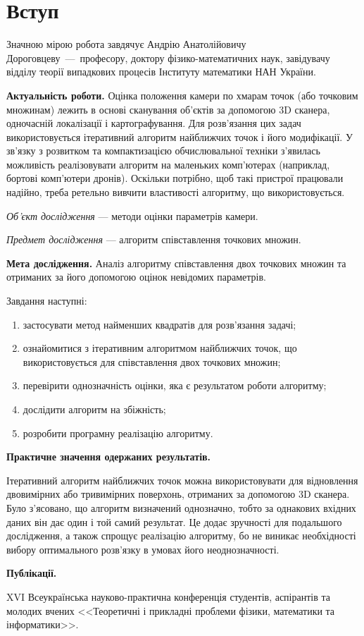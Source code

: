 \chapter*{Вступ}

Значною мірою робота завдячує Андрію Анатолійовичу Дороговцеву~---~професору,
доктору фізико-математичних наук,
завідувачу відділу теорії випадкових процесів Інституту математики НАН України.

\textbf{Актуальність роботи.}
Оцінка положення камери по хмарам точок (або точковим множинам)
лежить в основі сканування об'єктів за допомогою 3D сканера,
одночасній локалізації і картографування.
Для розв'язання цих задач використовується
ітеративний алгоритм найближчих точок і його модифікації.
У зв'язку з розвитком та компактизацією обчислювальної техніки
з'явилась можливість реалізовувати алгоритм на маленьких комп'ютерах (наприклад,
бортові комп'ютери дронів).
Оскільки потрібно, щоб такі пристрої працювали надійно,
треба ретельно вивчити властивості алгоритму, що використовується.

\textit{Об'єкт дослідження} ---
методи оцінки параметрів камери.

\textit{Предмет дослідження} ---
алгоритм співставлення точкових множин.

\textbf{Мета дослідження.}
Аналіз алгоритму співставлення двох точкових множин
та отриманих за його допомогою оцінок невідомих параметрів.

Завдання наступні:
\begin{enumerate}
  \item
    застосувати метод найменших квадратів для розв'язання задачі;
  \item
    ознайомитися з ітеративним алгоритмом найближчих точок,
    що використовується для співставлення двох точкових множин;
  \item
    перевірити однозначність оцінки, яка є результатом роботи алгоритму;
  \item
    дослідити алгоритм на збіжність;
  \item
    розробити програмну реалізацію алгоритму.
\end{enumerate}

\textbf{Практичне значення одержаних результатів.}

Ітеративний алгоритм найближчих точок можна використовувати для відновлення
двовимірних або тривимірних поверхонь, отриманих за допомогою 3D сканера.
Було з'ясовано, що алгоритм визначений однозначно, тобто за однакових вхідних
даних він дає один і той самий результат.
Це додає зручності для подальшого дослідження,
а також спрощує реалізацію алгоритму, бо не виникає необхідності вибору
оптимального розв'язку в умовах його неоднозначності.

\textbf{Публікації.}

XVI Всеукраїнська науково-практична конференція студентів,
аспірантів та молодих вчених <<Теоретичні і прикладні проблеми фізики,
математики та інформатики>>.
